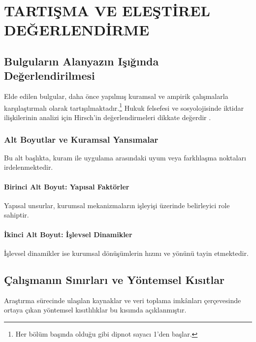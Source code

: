 \chapter{TARTIŞMA VE ELEŞTİREL DEĞERLENDİRME}

\section{Bulguların Alanyazın Işığında Değerlendirilmesi}

Elde edilen bulgular, daha önce yapılmış kuramsal ve ampirik çalışmalarla karşılaştırmalı olarak tartışılmaktadır.\footnote{Her bölüm başında olduğu gibi dipnot sayacı 1'den başlar.} Hukuk felsefesi ve sosyolojisinde iktidar ilişkilerinin analizi için Hirsch'in değerlendirmeleri dikkate değerdir \parencite{hirsch_iktidar}.

\subsection{Alt Boyutlar ve Kuramsal Yansımalar}

Bu alt başlıkta, kuram ile uygulama arasındaki uyum veya farklılaşma noktaları irdelenmektedir.

\subsubsection{Birinci Alt Boyut: Yapısal Faktörler}

Yapısal unsurlar, kurumsal mekanizmaların işleyişi üzerinde belirleyici role sahiptir.

\subsubsection{İkinci Alt Boyut: İşlevsel Dinamikler}

İşlevsel dinamikler ise kurumsal dönüşümlerin hızını ve yönünü tayin etmektedir.

\section{Çalışmanın Sınırları ve Yöntemsel Kısıtlar}

Araştırma sürecinde ulaşılan kaynaklar ve veri toplama imkânları çerçevesinde ortaya çıkan yöntemsel kısıtlılıklar bu kısımda açıklanmıştır.



